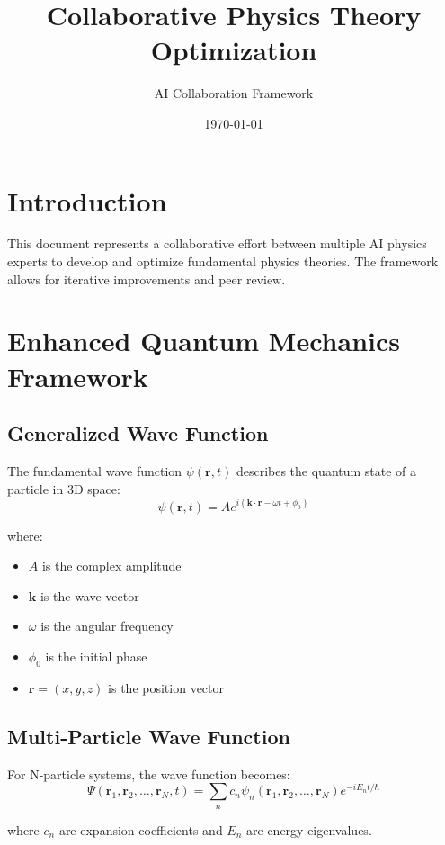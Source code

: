 \documentclass{article}
\title{Collaborative Physics Theory Optimization}
\author{AI Collaboration Framework}
\date{\today}
\begin{document}
\maketitle

\section{Introduction}
This document represents a collaborative effort between multiple AI physics experts to develop and optimize fundamental physics theories. The framework allows for iterative improvements and peer review.

\section{Enhanced Quantum Mechanics Framework}

\subsection{Generalized Wave Function}
The fundamental wave function $\psi(\mathbf{r},t)$ describes the quantum state of a particle in 3D space:
\begin{equation}
\psi(\mathbf{r},t) = A e^{i(\mathbf{k} \cdot \mathbf{r} - \omega t + \phi_0)}
\end{equation}

where:
\begin{itemize}
\item $A$ is the complex amplitude
\item $\mathbf{k}$ is the wave vector
\item $\omega$ is the angular frequency
\item $\phi_0$ is the initial phase
\item $\mathbf{r} = (x,y,z)$ is the position vector
\end{itemize}

\subsection{Multi-Particle Wave Function}
For N-particle systems, the wave function becomes:
\begin{equation}
\Psi(\mathbf{r}_1, \mathbf{r}_2, \ldots, \mathbf{r}_N, t) = \sum_{n} c_n \psi_n(\mathbf{r}_1, \mathbf{r}_2, \ldots, \mathbf{r}_N) e^{-iE_n t/\hbar}
\end{equation}

where $c_n$ are expansion coefficients and $E_n$ are energy eigenvalues.
\end{document}
